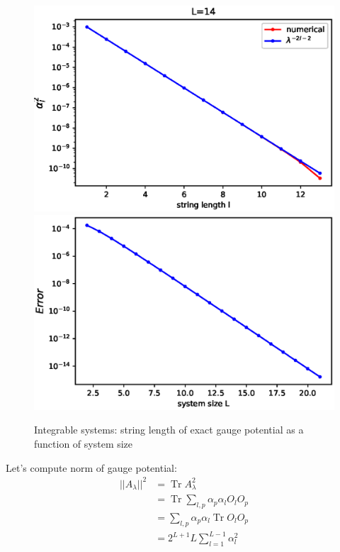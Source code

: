 \documentclass[11pt,a4paper]{article}
\DeclareMathOperator{\Tr}{Tr}
\begin{document}
\begin{figure}[!ht]
\begin{center}
\includegraphics[scale=0.7]{new_pics/alpha_num_theoret.eps}\\
\includegraphics[scale=0.7]{new_pics/error_alpha.eps}\\
\caption{Integrable systems: string length of exact gauge potential as a function of system size }
\end{center}
\end{figure}

Let's compute norm of gauge potential:
\begin{align}
||A_{\lambda}||^2 &= \Tr  A_{\lambda}^2 \\
&= \Tr \sum_{l,p}  \alpha_p \alpha_l O_l  O_p\\
&=  \sum_{l,p}  \alpha_p \alpha_l  \Tr O_l  O_p\\
&=  2^{L+1} L \sum_{l=1}^{L-1}   \alpha_l ^2
\end{align}
\end{document}
